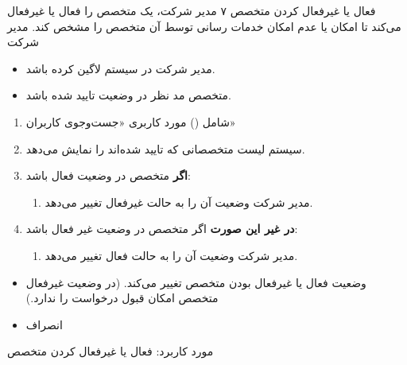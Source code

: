 {
\usecase
{فعال یا غیرفعال کردن متخصص}
{۷}
{مدیر شرکت، یک متخصص را فعال یا غیرفعال می‌کند تا امکان یا عدم امکان خدمات رسانی توسط آن متخصص را مشخص کند.}
{مدیر شرکت}
{}
{
\begin{itemize}
	\item 
	مدیر شرکت در سیستم لاگین کرده باشد.
	
	\item
	متخصص مد نظر در وضعیت تایید شده باشد.
\end{itemize}
}
{
\begin{enumerate}
	\item 
	شامل () مورد کاربری «جست‌وجوی کاربران»
	\item
	سیستم لیست متخصصانی که تایید شده‌اند را نمایش می‌دهد.
	
	\item
	\textbf{اگر} متخصص در وضعیت فعال باشد:
	\begin{enumerate}
		\item 
		مدیر شرکت وضعیت آن را به حالت غیرفعال تغییر می‌دهد.
	\end{enumerate}

\item
	\textbf{در غیر این صورت } اگر متخصص در وضعیت غیر فعال باشد:
\begin{enumerate}[label=\theenumi.\arabic*.]
	\item 
	مدیر شرکت وضعیت آن را به حالت فعال تغییر می‌دهد.
\end{enumerate}
\end{enumerate}
}
{\begin{itemize}
		\item وضعیت فعال یا غیرفعال بودن متخصص تغییر می‌کند. (در وضعیت غیرفعال متخصص امکان قبول درخواست را ندارد.)
\end{itemize}}
{
\begin{itemize}
	\item انصراف
\end{itemize}
}
{مورد کاربرد: فعال یا غیرفعال کردن متخصص}



}


